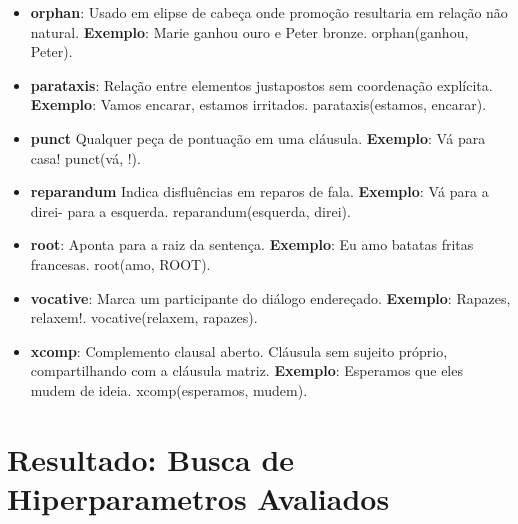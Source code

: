 \begin{itemize}
\item\textbf{orphan}: Usado em elipse de cabeça onde promoção resultaria em relação não natural. \textbf{Exemplo}: Marie ganhou ouro e Peter bronze. orphan(ganhou, Peter).

\item\textbf{parataxis}: Relação entre elementos justapostos sem coordenação explícita. \textbf{Exemplo}: Vamos encarar, estamos irritados. parataxis(estamos, encarar).

\item\textbf{punct} Qualquer peça de pontuação em uma cláusula. \textbf{Exemplo}: Vá para casa! punct(vá, !).

\item\textbf{reparandum} Indica disfluências em reparos de fala. \textbf{Exemplo}: Vá para a direi- para a esquerda. reparandum(esquerda, direi).

\item\textbf{root}: Aponta para a raiz da sentença. \textbf{Exemplo}: Eu amo batatas fritas francesas. root(amo, ROOT).

\item\textbf{vocative}: Marca um participante do diálogo endereçado. \textbf{Exemplo}: Rapazes, relaxem!. vocative(relaxem, rapazes).

\item\textbf{xcomp}: Complemento clausal aberto. Cláusula sem sujeito próprio, compartilhando com a cláusula matriz. \textbf{Exemplo}: Esperamos que eles mudem de ideia. xcomp(esperamos, mudem).

\end{itemize}

\section{Resultado: Busca de Hiperparametros Avaliados}
\label{cap:resultados_hiperparametros}


